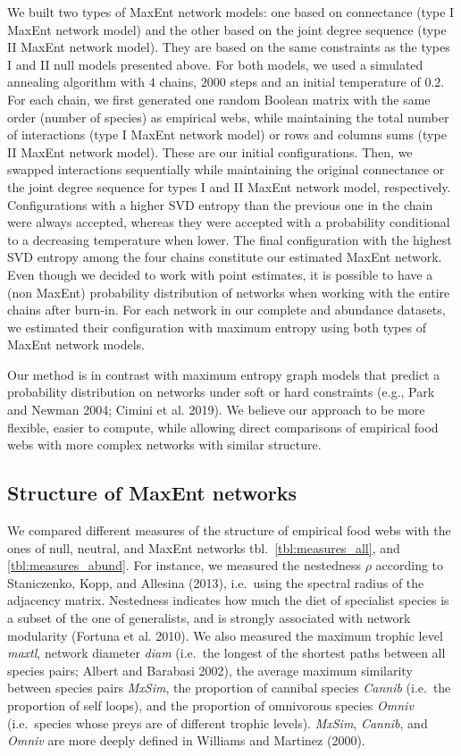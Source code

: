 \documentclass[10pt,oneside]{article}
\begin{document}
We built two types of MaxEnt network models: one based on connectance
(type I MaxEnt network model) and the other based on the joint degree
sequence (type II MaxEnt network model). They are based on the same
constraints as the types I and II null models presented above. For both
models, we used a simulated annealing algorithm with \(4\) chains,
\(2000\) steps and an initial temperature of \(0.2\). For each chain, we
first generated one random Boolean matrix with the same order (number of
species) as empirical webs, while maintaining the total number of
interactions (type I MaxEnt network model) or rows and columns sums
(type II MaxEnt network model). These are our initial configurations.
Then, we swapped interactions sequentially while maintaining the
original connectance or the joint degree sequence for types I and II
MaxEnt network model, respectively. Configurations with a higher SVD
entropy than the previous one in the chain were always accepted, whereas
they were accepted with a probability conditional to a decreasing
temperature when lower. The final configuration with the highest SVD
entropy among the four chains constitute our estimated MaxEnt network.
Even though we decided to work with point estimates, it is possible to
have a (non MaxEnt) probability distribution of networks when working
with the entire chains after burn-in. For each network in our complete
and abundance datasets, we estimated their configuration with maximum
entropy using both types of MaxEnt network models.

Our method is in contrast with maximum entropy graph models that predict
a probability distribution on networks under soft or hard constraints
(e.g., Park and Newman 2004; Cimini et al. 2019). We believe our
approach to be more flexible, easier to compute, while allowing direct
comparisons of empirical food webs with more complex networks with
similar structure.

\hypertarget{structure-of-maxent-networks}{%
\subsection{Structure of MaxEnt
networks}\label{structure-of-maxent-networks}}

We compared different measures of the structure of empirical food webs
with the ones of null, neutral, and MaxEnt networks
tbl.~\ref{tbl:measures_all}, and \ref{tbl:measures_abund}. For instance,
we measured the nestedness \(\rho\) according to Staniczenko, Kopp, and
Allesina (2013), i.e.~using the spectral radius of the adjacency matrix.
Nestedness indicates how much the diet of specialist species is a subset
of the one of generalists, and is strongly associated with network
modularity (Fortuna et al. 2010). We also measured the maximum trophic
level \emph{maxtl}, network diameter \emph{diam} (i.e.~the longest of
the shortest paths between all species pairs; Albert and Barabasi 2002),
the average maximum similarity between species pairs \emph{MxSim}, the
proportion of cannibal species \emph{Cannib} (i.e.~the proportion of
self loops), and the proportion of omnivorous species \emph{Omniv}
(i.e.~species whose preys are of different trophic levels).
\emph{MxSim}, \emph{Cannib}, and \emph{Omniv} are more deeply defined in
Williams and Martinez (2000).
\end{document}
